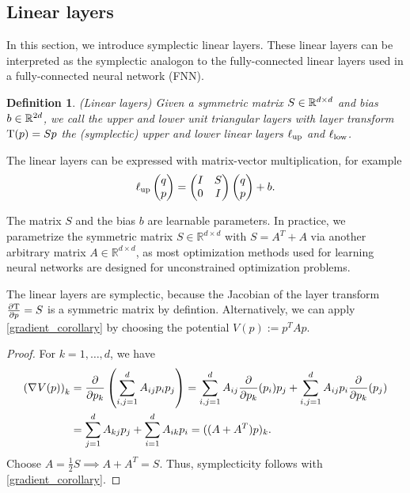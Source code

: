 \documentclass[twoside,a4paper]{article}
\newtheorem{definition}{Definition}
\begin{document}
\subsection{Linear layers}
In this section, we introduce symplectic linear layers. These linear layers can be interpreted 
as the symplectic analogon to the fully-connected linear layers used in a fully-connected
neural network (FNN).

\begin{definition}\label{def_linear_layer}
	(Linear layers)
	Given a symmetric matrix $S \in \mathbb{R}^{d \times d}$ and bias $b \in \mathbb{R}^{2d}$,
	we call the upper and lower unit triangular layers
	with layer transform $\mathrm{T}(p) = Sp$ the (symplectic) upper and lower 
	linear layers $\ell_{\text{up}}$ and $\ell_{\text{low}}$.
\end{definition}

The linear layers can be expressed with matrix-vector multiplication, for example
\begin{equation*}
	\ell_{\text{up}} \begin{pmatrix} q \\ p \end{pmatrix} = \begin{pmatrix}
		I & S \\
		0 & I
	\end{pmatrix} \begin{pmatrix} q \\ p \end{pmatrix} + b
	.
\end{equation*}

The matrix $S$ and the bias $b$ are learnable parameters.
In practice, we parametrize the symmetric matrix $S\in \mathbb{R}^{d \times d}$
with $S = A^T + A$ via another arbitrary matrix $A\in \mathbb{R}^{d \times d}$, as
most optimization methods used for learning neural networks are designed for
unconstrained optimization problems.

The linear layers are symplectic, because the Jacobian of the layer transform $\frac{\partial \mathrm{T}}{\partial p} = S$
is a symmetric matrix by defintion. Alternatively, we can apply \cref{gradient_corollary} by
choosing the potential $V(p) := p^TAp$.

\begin{proof}
	For $k=1, \dots, d$, we have
	\begin{align*}
		\left( \nabla_{}{V}(p) \right)_k &= \frac{\partial }{\partial p_k} \left( \sum_{i,j=1}^d A_{ij} p_i p_j \right)
		= \sum_{i,j=1}^d A_{ij} \frac{\partial }{\partial p_k}(p_i) p_j + \sum_{i,j=1}^d A_{ij} p_i \frac{\partial }{\partial p_k}(p_j) \\
		&= \sum_{j=1}^d A_{kj} p_j + \sum_{i=1}^d A_{ik} p_i = ((A+A^T)p)_k
		.
	\end{align*}
	Choose $A=\frac{1}{2}S \implies A+A^T=S$.
	Thus, symplecticity follows with \cref{gradient_corollary}.
\end{proof}
\end{document}
